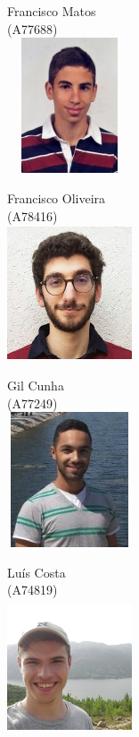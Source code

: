 \documentclass[a4paper]{article}
\begin{document}
\begin{titlepage}
\begin{center}
\noindent
\begin{minipage}{0.26\textwidth}
    Francisco Matos\\ \textsc{(A77688)}\\
    \includegraphics[height = 4cm, width=3.7cm]{capa/FranciscoMatos.jpg}\break
\end{minipage}%
\begin{minipage}{0.26\textwidth}
    Francisco Oliveira\\ \textsc{(A78416)}\\
    \includegraphics[height = 4cm, width=3.7cm]{capa/kiko.png}\break
\end{minipage}%
\begin{minipage}{0.26\textwidth}
    Gil Cunha\\ \textsc{(A77249)}\\
    \includegraphics[height = 4cm, width=3.7cm]{capa/gil.png}\break
\end{minipage}%
\begin{minipage}{0.26\textwidth}
    Luís Costa\\ \textsc{(A74819)}\\
    \includegraphics[height = 4cm, width=3.7cm]{capa/luis.jpg}\break
\end{minipage}%

\vfill


\end{center}
\end{titlepage}
\end{document}
